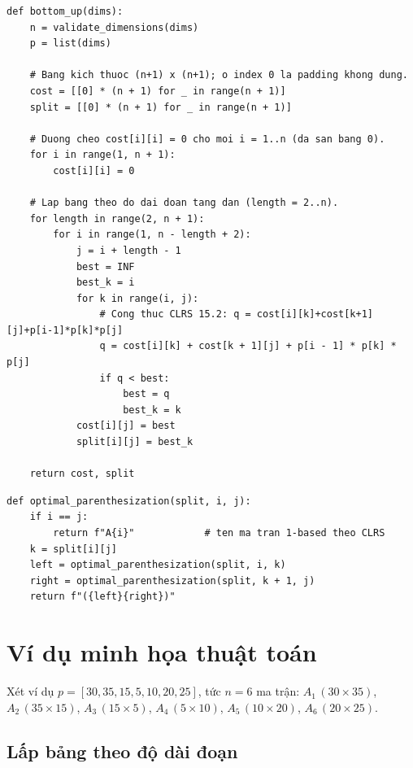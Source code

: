 \documentclass[12pt,a4paper]{article}
\begin{document}
\begin{lstlisting}[caption={Lấp bảng từ dưới lên - trích từ \texttt{core.py}}]
def bottom_up(dims):
    n = validate_dimensions(dims)
    p = list(dims)

    # Bang kich thuoc (n+1) x (n+1); o index 0 la padding khong dung.
    cost = [[0] * (n + 1) for _ in range(n + 1)]
    split = [[0] * (n + 1) for _ in range(n + 1)]

    # Duong cheo cost[i][i] = 0 cho moi i = 1..n (da san bang 0).
    for i in range(1, n + 1):
        cost[i][i] = 0

    # Lap bang theo do dai doan tang dan (length = 2..n).
    for length in range(2, n + 1):
        for i in range(1, n - length + 2):
            j = i + length - 1
            best = INF
            best_k = i
            for k in range(i, j):
                # Cong thuc CLRS 15.2: q = cost[i][k]+cost[k+1][j]+p[i-1]*p[k]*p[j]
                q = cost[i][k] + cost[k + 1][j] + p[i - 1] * p[k] * p[j]
                if q < best:
                    best = q
                    best_k = k
            cost[i][j] = best
            split[i][j] = best_k

    return cost, split
\end{lstlisting}

\begin{lstlisting}[caption={Truy vết dấu ngoặc - trích từ \texttt{core.py}}]
def optimal_parenthesization(split, i, j):
    if i == j:
        return f"A{i}"            # ten ma tran 1-based theo CLRS
    k = split[i][j]
    left = optimal_parenthesization(split, i, k)
    right = optimal_parenthesization(split, k + 1, j)
    return f"({left}{right})"
\end{lstlisting}

\section{Ví dụ minh họa thuật toán}

Xét ví dụ $p = [30, 35, 15, 5, 10, 20, 25]$, tức $n = 6$ ma trận: $A_1\,(30 \times 35)$, $A_2\,(35 \times 15)$, $A_3\,(15 \times 5)$, $A_4\,(5 \times 10)$, $A_5\,(10 \times 20)$, $A_6\,(20 \times 25)$. 

\subsection{Lấp bảng theo độ dài đoạn}
\end{document}
